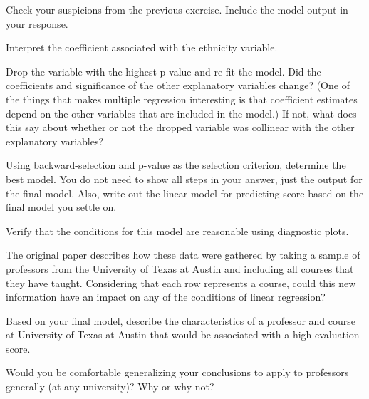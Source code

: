 \documentclass{article}\usepackage[]{graphicx}\usepackage[]{color}
\begin{document}
\begin{exercise}
Check your suspicions from the previous exercise. Include the model output in your response.
\end{exercise}

\begin{exercise}
Interpret the coefficient associated with the ethnicity variable.
\end{exercise}

\begin{exercise}
Drop the variable with the highest p-value and re-fit the model. Did the coefficients and significance of the other explanatory variables change? (One of the things that makes multiple regression interesting is that coefficient estimates depend on the other variables that are included in the model.) If not, what does this say about whether or not the dropped variable was collinear with the other explanatory variables?
\end{exercise}

\begin{exercise}
Using backward-selection and p-value as the selection criterion, determine the best model. You do not need to show all steps in your answer, just the output for the final model. Also, write out the linear model for predicting score based on the final model you settle on.
\end{exercise}

\begin{exercise}
Verify that the conditions for this model are reasonable using diagnostic plots.
\end{exercise}

\begin{exercise}
The original paper describes how these data were gathered by taking a sample of professors from the University of Texas at Austin and including all courses that they have taught.  Considering that each row represents a course, could this new information have an impact on any of the conditions of linear regression?
\end{exercise}

\begin{exercise}
Based on your final model, describe the characteristics of a professor and course at University of Texas at Austin that would be associated with a high evaluation score.
\end{exercise}

\begin{exercise}
Would you be comfortable generalizing your conclusions to apply to professors generally (at any university)?  Why or why not?
\end{exercise}
\end{document}
